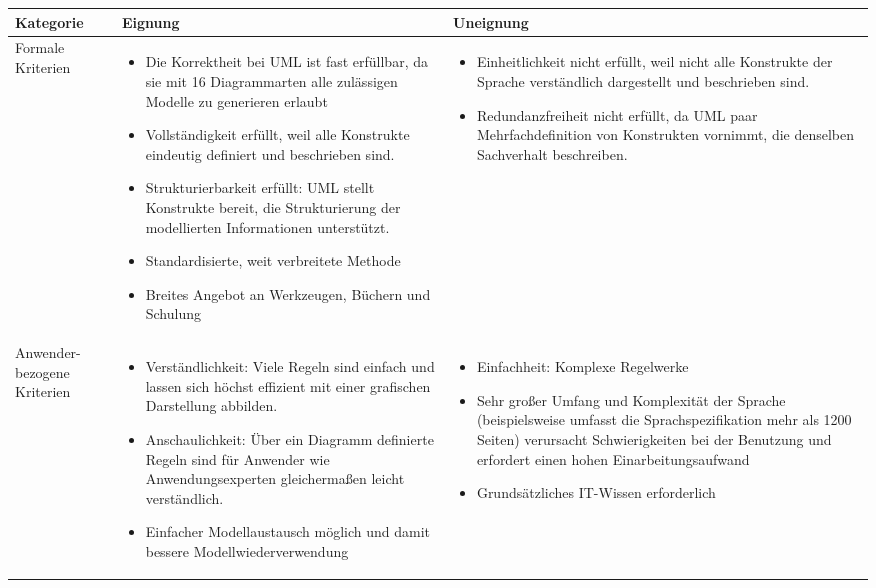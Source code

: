 		
\begin{tabularx}{\textwidth}{|p{2cm}|X|X|}
	\hline
	Kategorie & Eignung & Uneignung  \\
	\hline
	Formale Kriterien	&
	\begin{itemize}
		\item Die Korrektheit bei UML ist fast erfüllbar, da sie mit 16 Diagrammarten alle zulässigen Modelle zu generieren erlaubt
		\item Vollständigkeit erfüllt, weil alle Konstrukte eindeutig definiert und beschrieben sind.
		\item Strukturierbarkeit erfüllt: UML stellt Konstrukte bereit, die Strukturierung der modellierten Informationen unterstützt.
		\item Standardisierte, weit verbreitete Methode 
		\item Breites Angebot an Werkzeugen, Büchern und Schulung
	\end{itemize} & 
	\begin{itemize}
		\item Einheitlichkeit nicht erfüllt, weil nicht alle Konstrukte der Sprache verständlich dargestellt und beschrieben sind.
		\item Redundanzfreiheit nicht erfüllt, da UML paar Mehrfachdefinition von Konstrukten vornimmt, die denselben Sachverhalt beschreiben.
	\end{itemize} \\
	\hline
	Anwender- bezogene Kriterien &
	\begin{itemize}
		\item Verständlichkeit: Viele Regeln sind einfach und lassen sich höchst effizient mit einer grafischen Darstellung abbilden.
		\item Anschaulichkeit: Über ein Diagramm definierte Regeln sind für Anwender wie Anwendungsexperten gleichermaßen leicht verständlich.
		\item Einfacher Modellaustausch möglich und damit bessere Modellwiederverwendung 
	\end{itemize}  & 
	\begin{itemize}
		\item Einfachheit: Komplexe Regelwerke
		\item Sehr großer Umfang und Komplexität der Sprache (beispielsweise umfasst die Sprachspezifikation mehr als 1200 Seiten) verursacht Schwierigkeiten bei der Benutzung und erfordert einen hohen Einarbeitungsaufwand 
		\item Grundsätzliches IT-Wissen erforderlich 
	\end{itemize} \\
	\hline
\end{tabularx} 


